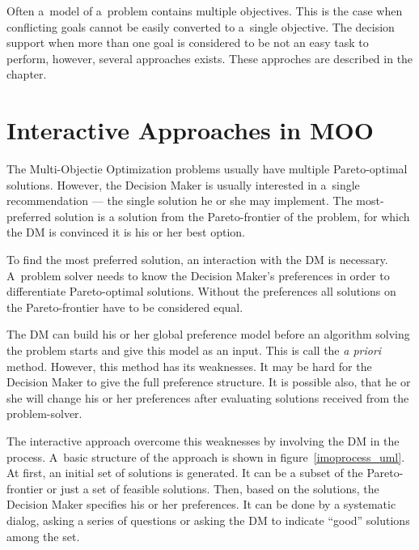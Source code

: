 Often a~model of a~problem contains multiple objectives. This is the case when
conflicting goals cannot be easily converted to a~single objective. The
decision support when more than one goal is considered to be not an easy task
to perform, however, several approaches exists. These approches are described
in the chapter.

\section{Interactive Approaches in MOO}
\label{sec_ia_in_moo}

The Multi-Objectie Optimization problems usually have multiple Pareto-optimal
solutions. However, the Decision Maker is usually interested in a~single
recommendation --- the single solution he or she may implement. The
most-preferred solution is a solution from the Pareto-frontier of the problem,
for which the DM is convinced it is his or her best option.

To find the most preferred solution, an interaction with the DM is
necessary. A~problem solver needs to know the Decision Maker's preferences in
order to differentiate Pareto-optimal solutions. Without the preferences all
solutions on the Pareto-frontier have to be considered equal.

The DM can build his or her global preference model before an algorithm
solving the problem starts and give this model as an input. This is call the
\textit{a priori} method. However, this method has its weaknesses. It may be
hard for the Decision Maker to give the full preference structure. It is
possible also, that he or she will change his or her preferences after
evaluating solutions received from the problem-solver. 

The interactive approach overcome this weaknesses by involving the DM in the
process. A~basic structure of the approach is shown in
figure~\ref{imoprocess_uml}. At first, an initial set of solutions is
generated. It can be a subset of the Pareto-frontier or just a set of feasible
solutions. Then, based on the solutions, the Decision Maker specifies his or
her preferences. It can be done by a systematic dialog, asking a series of
questions or asking the DM to indicate ``good'' solutions among the set.


